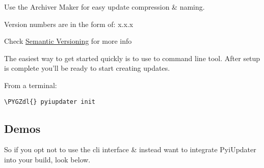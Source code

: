 \documentclass[letterpaper,10pt,english]{sphinxmanual}
\def\PYGZdl{\char`\$}
\begin{document}
Use the Archiver Maker for easy update compression \& naming.

Version numbers are in the form of: x.x.x

Check \href{http://semver.org/}{Semantic Versioning} for more info

The easiest way to get started quickly is to use to command line tool. After setup is complete you'll be ready to start creating updates.

From a terminal:

\begin{Verbatim}[commandchars=\\\{\}]
\PYGZdl{} pyiupdater init
\end{Verbatim}


\subsection{Demos}
\label{usage:demos}
So if you opt not to use the cli interface \& instead want to integrate PyiUpdater into your build, look below.
\end{document}
